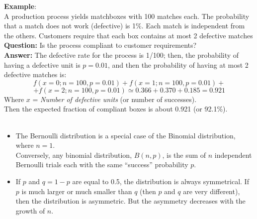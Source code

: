 \begin{frame}
  \begin{small}
    \textbf{Example}:\\
    A production process yields matchboxes with 100 matches each. The probability that a match does not work (defective) is 1\%. Each match is independent from the others. Customers require that each box contains at most 2 defective matches \\
    \textbf{Question:} Is the process compliant to customer requirements?\\
    \vspace{.15cm}
    \textbf{Answer:} The defective rate for the process is 1/100; then, the probability of having a defective unit is $p=0.01$, and then the probability of having at most 2 defective matches is:
    $$ f(x=0;n=100,p=0.01) + f(x=1;n=100,p=0.01) +  $$  
    $$ + f(x=2;n=100,p=0.01) \simeq 0.366 + 0.370 + 0.185 = 0.921$$ 
    \vspace*{.4cm}
    Where $x$ = \textit{Number of defective units} (or number of successes). \\
    Then the expected fraction of compliant boxes is about 0.921 (or 92.1\%). \\ \hspace*{11cm} \Square \\
  \end{small}
\end{frame}

\begin{frame}
  \vspace{.5cm}
  \begin {itemize}
    \item  The Bernoulli distribution is a special case of the Binomial distribution, where $n = 1$.  \\ Conversely, any binomial distribution, $B(n, p)$, is the sum of $n$ independent Bernoulli trials each with the same ``success'' probability $p$.
    \vspace{.5cm}
    \item If $p$ and  {\boldmath $ q = 1-p $}  are equal to 0.5, the distribution is always symmetrical. If $p$ is much larger or much smaller than $q$ (then $p$ and $q$ are very different), then the distribution is asymmetric. But the asymmetry decreases with the growth of $n$.
  \end{itemize}
\end{frame}


